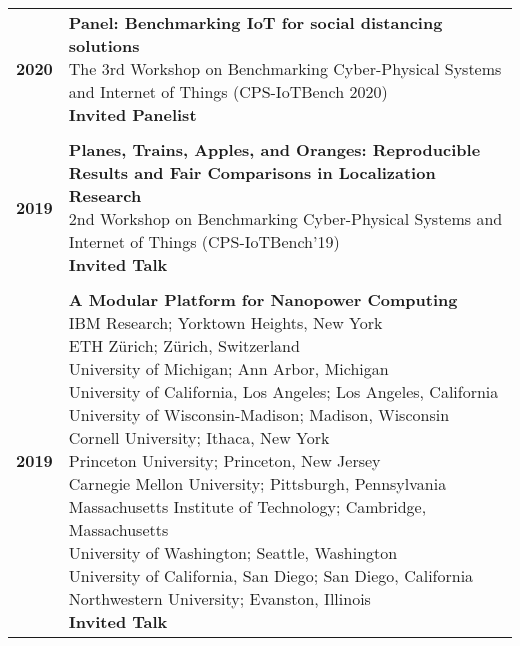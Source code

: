 \documentclass{article}
\begin{document}
\renewcommand{\arraystretch}{0.5}
\begin{longtable}{>{\bf}p{1cm} l}
  2020 & \makecell{
    \textbf{Panel: Benchmarking IoT for social distancing solutions} \\
    The 3rd Workshop on Benchmarking Cyber-Physical Systems and Internet of Things (CPS-IoTBench 2020) \\
    \textbf{\color{BrickRed} Invited Panelist} \\
  } \\

  \\

  2019 & \makecell{
    \textbf{Planes, Trains, Apples, and Oranges: Reproducible Results and Fair Comparisons in Localization Research} \\
    2nd Workshop on Benchmarking Cyber-Physical Systems and Internet of Things (CPS-IoTBench'19) \\
    \textbf{\color{BrickRed} Invited Talk} \\
  } \\

  \\

  2019 & \makecell{
    \textbf{A Modular Platform for Nanopower Computing} \\
    IBM Research; Yorktown Heights, New York \\
    ETH Z\"urich; Z\"urich, Switzerland \\
    University of Michigan; Ann Arbor, Michigan \\
    University of California, Los Angeles; Los Angeles, California \\
    University of Wisconsin-Madison; Madison, Wisconsin \\
    Cornell University; Ithaca, New York \\
    Princeton University; Princeton, New Jersey \\
    Carnegie Mellon University; Pittsburgh, Pennsylvania \\
    Massachusetts Institute of Technology; Cambridge, Massachusetts \\
    University of Washington; Seattle, Washington \\
    University of California, San Diego; San Diego, California \\
    Northwestern University; Evanston, Illinois \\
    \textbf{\color{BrickRed} Invited Talk} \\
  } \\


\end{longtable}
\end{document}
